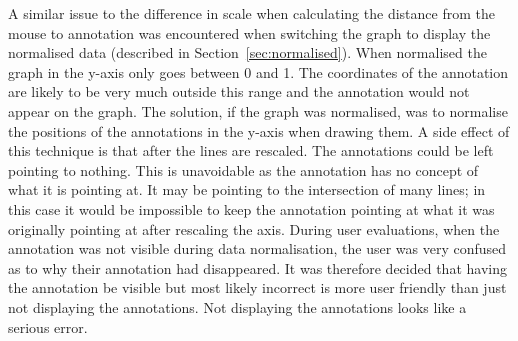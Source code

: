 A similar issue to the difference in scale when calculating the distance from the mouse to annotation was encountered when switching the graph to display the normalised data (described in Section~\ref{sec:normalised}).  When normalised the graph in the y-axis only goes between 0 and 1.  The coordinates of the annotation are likely to be very much outside this range and the annotation would not appear on the graph.  The solution, if the graph was normalised, was to normalise the positions of the annotations in the y-axis when drawing them.  A side effect of this technique is that after the lines are rescaled.  The annotations could be left pointing to nothing.  This is unavoidable as the annotation has no concept of what it is pointing at.  It may be pointing to the intersection of many lines; in this case it would be impossible to keep the annotation pointing at what it was originally pointing at after rescaling the axis.  During user evaluations, when the annotation was not visible during data normalisation, the user was very confused as to why their annotation had disappeared.  It was therefore decided that having the annotation be visible but most likely incorrect is more user friendly than just not displaying the annotations.  Not displaying the annotations looks like a serious error.

